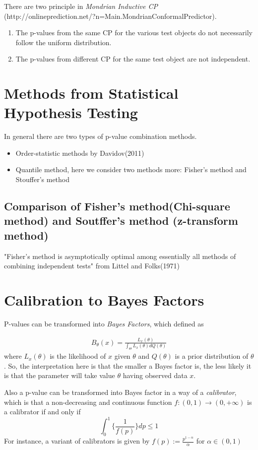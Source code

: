 \documentclass[10pt,a4paper]{article}
\begin{document}
There are two principle in \textit{Mondrian Inductive CP}\\
(http://onlineprediction.net/?n=Main.MondrianConformalPredictor).
 \begin{enumerate}
     \item The p-values from the same CP for the various test objects do not necessarily follow the uniform distribution.
     \item The p-values from different CP for the same test object are not independent.
 \end{enumerate}

\section{Methods from Statistical Hypothesis Testing}
In general there are two types of p-value combination methods.
\begin{itemize}
    \item Order-statistic methods by Davidov(2011)\cite{davidov2011combining}
    \item Quantile method, here we consider two methods more: Fisher's method and Stouffer's method
\end{itemize}

\subsection{Comparison of Fisher's method(Chi-square method) and Soutffer's method (z-transform method)}
"Fisher’s method is asymptotically optimal among essentially all methods of combining
independent tests" from Littel and Folks(1971) \cite{littell1971asymptotic}

\section{Calibration to Bayes Factors}
P-values can be transformed into \textit{Bayes Factors}, which defined as 

\begin{gather}
B_{\theta}(x) = \frac{L_{x}(\theta)}{\int_{\Theta} L_{x}(\theta) dQ(\theta)}
\end{gather}
where $L_{x}(\theta)$ is the likelihood of $x$ given $\theta$ and $Q(\theta)$ is a prior distribution of $\theta$. So, the interpretation here is that the smaller a Bayes factor is, the less likely it is that the parameter will take value $\theta$ having observed data $x$.

Also a p-value can be transformed into Bayes factor in a way of a \textit{calibrator}, which is that a non-decreasing and continuous function $f:(0,1) \rightarrow (0, + \infty)$ is a calibrator if and only if
$$
\int^1_0 \{ \frac{1}{f(p)} \} dp \leq 1
$$ For instance, a variant of calibrators is given by $f(p) := \frac{p^{1-\alpha}}{\alpha}$ for $\alpha \in (0,1)$
\end{document}
